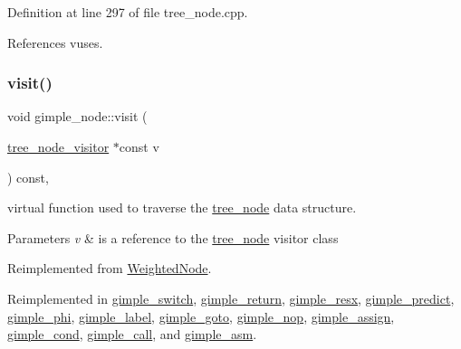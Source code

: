 Definition at line 297 of file tree\+\_\+node.\+cpp.



References vuses.

\mbox{\label{structgimple__node_a337b029a3aca9c1b96311b6e6668f7f3}} 
\subsubsection{\texorpdfstring{visit()}{visit()}}
{\footnotesize\ttfamily void gimple\+\_\+node\+::visit (\begin{DoxyParamCaption}\item[{\hyperlink{classtree__node__visitor}{tree\+\_\+node\+\_\+visitor} $\ast$const}]{v }\end{DoxyParamCaption}) const\hspace{0.3cm}{\ttfamily [override]}, {\ttfamily [virtual]}}



virtual function used to traverse the \hyperlink{classtree__node}{tree\+\_\+node} data structure. 


\begin{DoxyParams}{Parameters}
{\em v} & is a reference to the \hyperlink{classtree__node}{tree\+\_\+node} visitor class \\
\hline
\end{DoxyParams}


Reimplemented from \hyperlink{structWeightedNode_a6f976feccb640a60f96475a668314fde}{Weighted\+Node}.



Reimplemented in \hyperlink{structgimple__switch_a2fc71fef3c7d9d08e116ca7dba93d0e2}{gimple\+\_\+switch}, \hyperlink{structgimple__return_a96de93cec9dfd2df931c05bfe673f532}{gimple\+\_\+return}, \hyperlink{structgimple__resx_aeaec0bead312592457e09d043bc76fea}{gimple\+\_\+resx}, \hyperlink{structgimple__predict_af7e0810d1e453a5f90ceefaaa4d2c1f3}{gimple\+\_\+predict}, \hyperlink{structgimple__phi_a833830c256d428292a6d38e32cb7eabd}{gimple\+\_\+phi}, \hyperlink{structgimple__label_a7948e2a870e18e9a7c7d8a722a6fa26b}{gimple\+\_\+label}, \hyperlink{structgimple__goto_a201fad3cf9302bdcd1c462b9d581d298}{gimple\+\_\+goto}, \hyperlink{structgimple__nop_a332a68c582fd619f0fc2807fd90703d8}{gimple\+\_\+nop}, \hyperlink{structgimple__assign_afc25fa9b669662e4f64f09c62284dec2}{gimple\+\_\+assign}, \hyperlink{structgimple__cond_a1985767ad1b09766b8d32897826dbf48}{gimple\+\_\+cond}, \hyperlink{structgimple__call_ab493870aac4460fe2d52315b61ee5992}{gimple\+\_\+call}, and \hyperlink{structgimple__asm_ac2ba4ccbf1f1085bcf1e0c9d6c06d706}{gimple\+\_\+asm}.



